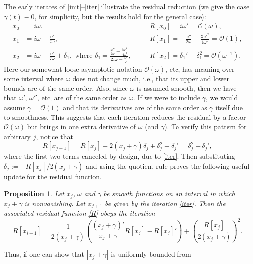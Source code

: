 \documentclass[10pt]{article}
\newcommand{\be}{\begin{equation}}
\newcommand{\ee}{\end{equation}}
\newcommand{\bigO}{{\mathcal O}}
\newtheorem{pro}[thm]{Proposition}
\newcommand{\om}{\omega}
\newcommand{\g}{\gamma}
\begin{document}
The early iterates of \eqref{init}--\eqref{iter} illustrate
the residual reduction (we give the case $\g(t) \equiv 0$, for
simplicity, but the results hold for the general case):
\begin{align}
    x_0 &=  i\om, &&R[x_0] = i\om' = \bigO(\om), \nonumber \\
x_1 &= i\om - \frac{\om'}{2\om}, 
    &&R[x_1] = -\frac{\om''}{2\om} + \frac{3\om'^2}{4\om^2} = \bigO(1), \nonumber \\
x_2 &= i\om - \frac{\om'}{2\om} + \delta_1, \mbox{ where }
    \delta_1 = \frac{\frac{\om''}{2\om} - \frac{3\om'^2}{4\om^2}}{2i\om - \frac{\om'}{\om}}, \quad
    &&R[x_2] = \delta_1' + \delta_1^2 = \bigO(\om^{-1}). \nonumber
\end{align}
Here our somewhat loose asymptotic notation $\bigO(\om)$, etc,
has meaning over some interval where $\om$ does not change much,
i.e., that its upper and lower bounds are of the same order.
Also, since $\om$ is assumed smooth, then we have that $\om'$, $\om''$, etc, are
of the same order as $\om$.
If we were to include $\g$, we would assume $\g = \bigO(1)$
and that its derivatives are of the same order as $\g$ itself due to smoothness.
This suggests that each iteration reduces the residual by a factor $\bigO(\om)$
but brings in one extra derivative of $\om$ (and $\g$).
To verify this pattern for arbitrary $j$, notice that
$$
R[x_{j+1}] = R[x_j] + 2\left(x_j + \g \right)\delta_j  + \delta_j^2 + \delta_j' = \delta_j^2 + \delta_j',
$$
where the first two terms canceled by design, due to \cref{iter}.
Then substituting $\delta_j := -R[x_j]/2(x_j + \g)$ and using
the quotient rule proves the following useful update
for the residual function.
\begin{pro}\label{PRiter}  %
  Let $x_j$, $\om$ and $\gamma$ be smooth functions on an interval
  in which $x_j+\gamma$ is nonvanishing.
  Let $x_{j+1}$ be given by the iteration \cref{iter}.
  Then the associated residual function \cref{R} obeys the iteration
  \be
  \label{Riter}
    R[x_{j+1}] = \frac{1}{2(x_j + \g)}\left( \frac{(x_j + \g)'}{x_j + \g} R[x_j] - R[x_j]' \right) 
    + \left(\frac{R[x_j]}{2(x_j + \g)}\right)^2. 
  \ee
\end{pro}                  %
Thus, if one can show that $|x_j+\gamma|$ is uniformly bounded from
\end{document}
